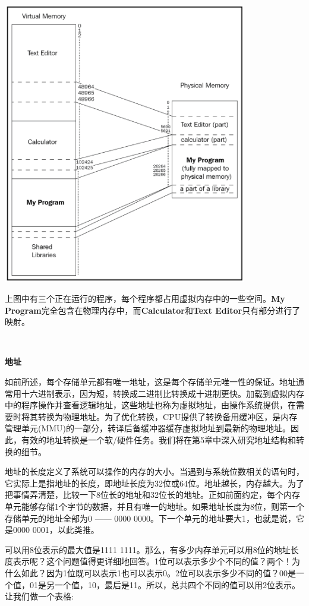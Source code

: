 \begin{center}
	\includegraphics[width=0.8\textwidth]{content/Section-1/Chapter-2/7}
\end{center}

上图中有三个正在运行的程序，每个程序都占用虚拟内存中的一些空间。\textbf{My Program}完全包含在物理内存中，而\textbf{Calculator}和\textbf{Text Editor}只有部分进行了映射。 \par

\noindent\textbf{}\ \par
\textbf{地址} \ \par
如前所述，每个存储单元都有唯一地址，这是每个存储单元唯一性的保证。地址通常用十六进制表示，因为短，转换成二进制比转换成十进制更快。加载到虚拟内存中的程序操作并查看逻辑地址，这些地址也称为虚拟地址，由操作系统提供，在需要时将其转换为物理地址。为了优化转换，CPU提供了转换备用缓冲区，是内存管理单元(MMU)的一部分，转译后备缓冲器缓存虚拟地址到最新的物理地址。因此，有效的地址转换是一个软/硬件任务。我们将在第5章中深入研究地址结构和转换的细节。 \par
地址的长度定义了系统可以操作的内存的大小。当遇到与系统位数相关的语句时，它实际上是指地址的长度，即地址长度为32位或64位。地址越长，内存越大。为了把事情弄清楚，比较一下8位长的地址和32位长的地址。正如前面约定，每个内存单元能够存储1个字节的数据，并且有唯一的地址。如果地址长度为8位，则第一个存储单元的地址全部为0 —— 0000 0000。下一个单元的地址要大1，也就是说，它是0000 0001，以此类推。 \par
可以用8位表示的最大值是1111 1111。那么，有多少内存单元可以用8位的地址长度表示呢？这个问题值得更详细地回答。1位可以表示多少个不同的值？两个！为什么如此？因为1位既可以表示1也可以表示0。2位可以表示多少不同的值？00是一个值，01是另一个值，10，最后是11。所以，总共四个不同的值可以用2位表示。让我们做一个表格: \par


